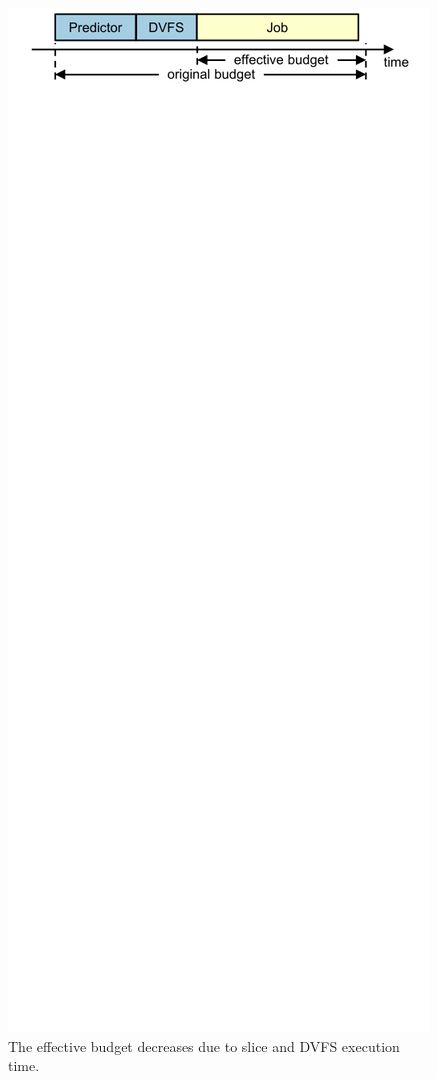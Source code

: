\begin{figure}
  \begin{center}
    \includegraphics{exec_time_prediction/figs/effective_budget.pdf}
    \caption{The effective budget decreases due to slice and DVFS execution time.}
    \label{fig:prediction.effective_budget}
  \end{center}
\end{figure}

